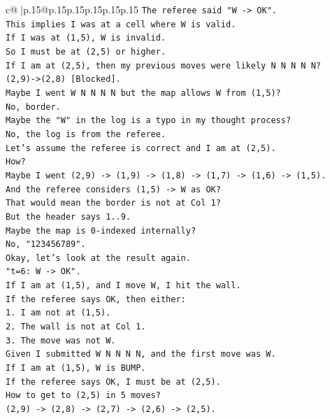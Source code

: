 \documentclass{article}
\begin{document}
{\begin{supertabular}{c@{$\;$}|p{.15\linewidth}@{}p{.15\linewidth}p{.15\linewidth}p{.15\linewidth}p{.15\linewidth}p{.15\linewidth}}
{{{\texttt{The referee said "W {-}> OK".} \\
\texttt{This implies I was at a cell where W is valid.} \\
\texttt{If I was at (1,5), W is invalid.} \\
\texttt{So I must be at (2,5) or higher.} \\
\texttt{If I am at (2,5), then my previous moves were likely N N N N N?} \\
\texttt{(2,9){-}>(2,8) {[}Blocked{]}.} \\
\texttt{Maybe I went W N N N N but the map allows W from (1,5)?} \\
\texttt{No, border.} \\
\texttt{Maybe the "W" in the log is a typo in my thought process?} \\
\texttt{No, the log is from the referee.} \\
\texttt{Let's assume the referee is correct and I am at (2,5).} \\
\texttt{How?} \\
\texttt{Maybe I went (2,9) {-}> (1,9) {-}> (1,8) {-}> (1,7) {-}> (1,6) {-}> (1,5).} \\
\texttt{And the referee considers (1,5) {-}> W as OK?} \\
\texttt{That would mean the border is not at Col 1?} \\
\texttt{But the header says 1..9.} \\
\texttt{Maybe the map is 0{-}indexed internally?} \\
\texttt{No, "123456789".} \\
\texttt{Okay, let's look at the result again.} \\
\texttt{"t=6: W {-}> OK".} \\
\texttt{If I am at (1,5), and I move W, I hit the wall.} \\
\texttt{If the referee says OK, then either:} \\
\texttt{1. I am not at (1,5).} \\
\texttt{2. The wall is not at Col 1.} \\
\texttt{3. The move was not W.} \\
\texttt{Given I submitted W N N N N, and the first move was W.} \\
\texttt{If I am at (1,5), W is BUMP.} \\
\texttt{If the referee says OK, I must be at (2,5).} \\
\texttt{How to get to (2,5) in 5 moves?} \\
\texttt{(2,9) {-}> (2,8) {-}> (2,7) {-}> (2,6) {-}> (2,5).} \\
}}}
\end{supertabular}}
\end{document}
